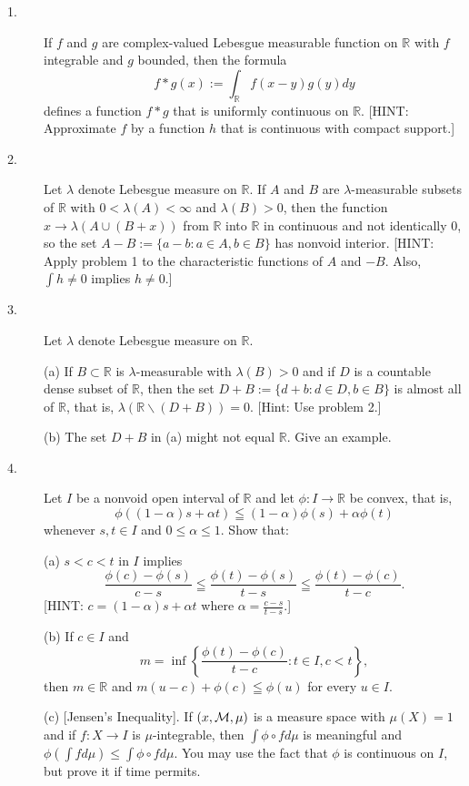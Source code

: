\documentclass{article}
\def\R{\mathbb R}
\begin{document}
\begin{description}
\item[1.]
If $f$ and $g$ are complex-valued Lebesgue measurable function on $\R$ with
$f$ integrable and $g$ bounded, then the formula
$$f \ast g(x) := \int_\R f(x-y) g(y) dy$$
defines a function $f \ast g$ that is uniformly continuous on $\R$. [HINT:
Approximate $f$ by a function $h$ that is continuous with compact support.]

\item[2.]
Let $\lambda$ denote Lebesgue measure on $\R$. If $A$ and $B$ are
$\lambda$-measurable subsets of $\R$ with $0 < \lambda (A) < \infty$ and
$\lambda(B) > 0$, then the function $x\to \lambda (A\cup (B+x))$ from
$\R$ into $\R$ in continuous and not identically 0, so the set
$A-B := \{a-b: a \in A, b \in B\}$ has nonvoid interior. [HINT: Apply
problem 1 to the characteristic functions of $A$ and $-B$. Also,
$\int h \neq 0$ implies $h \neq 0$.]

\item[3.]
Let $\lambda$ denote Lebesgue measure on $\R$.

\item[\quad] (a)
If $B \subset \R$ is $\lambda$-measurable with $\lambda (B) >0$ and if $D$ is
a countable dense subset of $\R$, then the set
$D+B := \{d +b: d \in D, b \in B\}$ is almost all of $\R$, that is,
$\lambda (\R \backslash (D+B)) = 0$. [Hint: Use problem 2.]

\item[\quad] (b)
The set $D+B$ in (a) might not equal $\R$. Give an example.

\item[4.]
Let $I$ be a nonvoid open interval of $\R$ and let $\phi : I\to \R$ be
convex, that is,
$$\phi ((1-\alpha) s + \alpha t) \leqq (1-\alpha) \phi (s) + \alpha \phi (t)$$
whenever $s,t \in I$ and $0 \leq \alpha \leq 1$. Show that:

\item[\quad] (a)
$s < c < t$ in $I$ implies
$$\frac{\phi (c) - \phi (s)}{c-s} \leqq \frac{\phi (t) - \phi (s)}{t-s}
  \leqq \frac{\phi (t) - \phi (c)}{t-c}.$$
[HINT: $c=(1-\alpha)s + \alpha t$ where $\alpha = \frac{c-s}{t-s}$.]

\item[\quad] (b)
If $c \in I$ and
$$m= \inf \left\{\frac{\phi (t) - \phi (c)}{t-c} :t \in I, c < t \right\},$$
then $m \in \R$ and $m(u-c) + \phi (c) \leqq \phi (u)$ for every $u \in I$.

\item[\quad] (c)
[Jensen's Inequality]. If $(x, {\cal M}, \mu)$ is a measure space with
$\mu (X) =1$ and if $f:X \to I$ is $\mu$-integrable, then
$\int \phi \circ f d \mu$ is meaningful and
$\phi(\int fd\mu) \leq \int \phi \circ fd\mu$. You may use the fact that
$\phi$ is continuous on $I$, but prove it if time permits.


\end{description}
\end{document}
